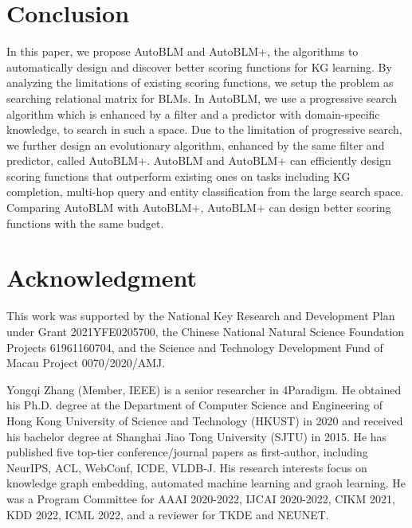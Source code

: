 \documentclass[10pt,journal,compsoc]{IEEEtran}
\begin{document}
\section{Conclusion}
\label{sec:conclusion}

In this paper, we propose AutoBLM and AutoBLM+, 
the algorithms to automatically design and discover better scoring functions for KG learning.
By analyzing the limitations of existing scoring functions,
we setup the problem as searching relational matrix for BLMs.
In AutoBLM,
we use a progressive search algorithm
which is enhanced by a filter and a predictor with domain-specific knowledge,
to search in such a space.
Due to the limitation of progressive search,
we further design an evolutionary algorithm,
enhanced by the same filter and predictor,
called AutoBLM+.
AutoBLM and AutoBLM+ can efficiently design scoring functions
that outperform existing ones on tasks
including 
KG completion,
multi-hop query
and entity classification from the large search space.
Comparing AutoBLM with AutoBLM+,
 AutoBLM+ can
 design better scoring functions
with the same budget.


\section*{Acknowledgment}
This work was supported by the National Key Research and Development Plan under Grant 2021YFE0205700, the Chinese National Natural Science Foundation Projects 61961160704, and the Science and Technology Development Fund of Macau Project 0070/2020/AMJ.




\begin{IEEEbiography}{Yongqi Zhang}
	(Member, IEEE)
is a senior researcher in 4Paradigm.
He obtained his Ph.D. degree at the Department of Computer Science and Engineering of Hong Kong University of Science and Technology (HKUST) in 2020 and received his bachelor degree at Shanghai Jiao Tong University (SJTU) in 2015.
He has published five top-tier conference/journal papers as first-author, including NeurIPS, ACL, WebConf, ICDE, VLDB-J.
His research interests focus on knowledge graph embedding,
automated machine learning and graoh learning.
He was a Program Committee for AAAI 2020-2022, IJCAI 2020-2022, CIKM 2021, KDD 2022, ICML 2022, and a reviewer for TKDE and NEUNET.
\end{IEEEbiography}
\end{document}
